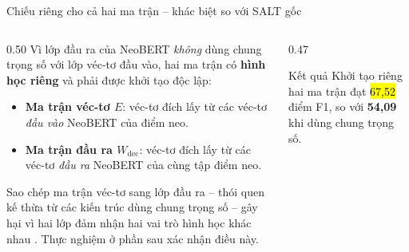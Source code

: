 \begin{frame}{Chiếu riêng cho cả hai ma trận -- khác biệt so với SALT gốc}
\vspace{0.3em}
\begin{columns}[T]
\begin{column}{0.50\textwidth}
  Vì lớp đầu ra của NeoBERT \emph{không} dùng chung trọng số với lớp véc-tơ
  đầu vào, hai ma trận có \textbf{hình học riêng} và phải được khởi tạo
  độc lập:

  \vspace{0.4em}
  \begin{itemize}\itemsep2pt
    \item \textbf{Ma trận véc-tơ $E$}: véc-tơ đích lấy từ các véc-tơ
          \emph{đầu vào} NeoBERT của điểm neo.
    \item \textbf{Ma trận đầu ra $W_{\mathrm{dec}}$}: véc-tơ đích lấy từ các
          véc-tơ \emph{đầu ra} NeoBERT của cùng tập điểm neo.
  \end{itemize}

  \vspace{0.5em}
  {\footnotesize Sao chép ma trận véc-tơ sang lớp đầu ra -- thói quen kế thừa
  từ các kiến trúc dùng chung trọng số -- gây hại vì hai lớp đảm nhận hai vai
  trò hình học khác nhau . Thực nghiệm ở phần sau xác nhận
  điều này.}
\end{column}

\begin{column}{0.47\textwidth}
\centering
{}

\vspace{0.5em}
\begin{alertblock}{Kết quả}
  \small Khởi tạo riêng hai ma trận đạt \hl{67,52} điểm F1, so với
  \textbf{54,09} khi dùng chung trọng số.
\end{alertblock}
\end{column}
\end{columns}
\end{frame}

